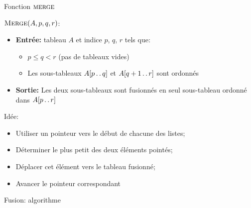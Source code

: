 \begin{frame}{Fonction $\textnormal{\scshape merge}$}

$\textnormal{\scshape Merge}(A,p,q,r)$:
\begin{itemize}
\item {\bf Entrée:} tableau $A$ et indice $p$, $q$, $r$ tels que:
\begin{itemize}
\item $p\leq q<r$ (pas de tableaux vides)
\item Les sous-tableaux $A[p\mathinner{\ldotp\ldotp} q]$ et $A[q+1\mathinner{\ldotp\ldotp} r]$ sont ordonnés
\end{itemize}
\item {\bf Sortie:} Les deux sous-tableaux sont fusionnés en seul sous-tableau ordonné dans $A[p\mathinner{\ldotp\ldotp} r]$
\end{itemize}

\bigskip

Idée:
\begin{itemize}
\item Utiliser un pointeur vers le début de chacune des listes;
\item Déterminer le plus petit des deux éléments pointés;
\item Déplacer cet élément vers le tableau fusionné;
\item Avancer le pointeur correspondant
\end{itemize}


\end{frame}

\begin{frame}{Fusion: algorithme}

\begin{center}\small
\end{center}
\end{frame}

